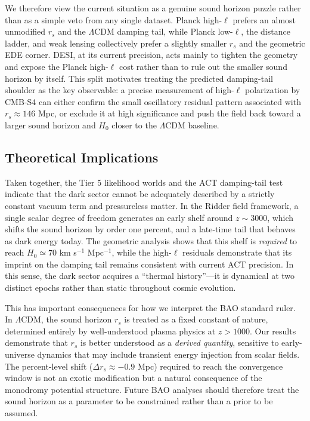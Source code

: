 \documentclass[a4paper,11pt]{article}
\begin{document}
We therefore view the current situation as a genuine sound horizon puzzle rather than as a simple veto from any single dataset. Planck high-$\ell$ prefers an almost unmodified $r_s$ and the $\Lambda$CDM damping tail, while Planck low-$\ell$, the distance ladder, and weak lensing collectively prefer a slightly smaller $r_s$ and the geometric EDE corner. DESI, at its current precision, acts mainly to tighten the geometry and expose the Planck high-$\ell$ cost rather than to rule out the smaller sound horizon by itself. This split motivates treating the predicted damping-tail shoulder as the key observable: a precise measurement of high-$\ell$ polarization by CMB-S4 can either confirm the small oscillatory residual pattern associated with $r_s \approx 146$ Mpc, or exclude it at high significance and push the field back toward a larger sound horizon and $H_0$ closer to the $\Lambda$CDM baseline.

\subsection*{Theoretical Implications}

Taken together, the Tier 5 likelihood worlds and the ACT damping-tail test indicate that the dark sector cannot be adequately described by a strictly constant vacuum term and pressureless matter. In the Ridder field framework, a single scalar degree of freedom generates an early shelf around $z \sim 3000$, which shifts the sound horizon by order one percent, and a late-time tail that behaves as dark energy today. The geometric analysis shows that this shelf is \emph{required} to reach $H_0 \simeq 70$ km s$^{-1}$ Mpc$^{-1}$, while the high-$\ell$ residuals demonstrate that its imprint on the damping tail remains consistent with current ACT precision. In this sense, the dark sector acquires a ``thermal history''---it is dynamical at two distinct epochs rather than static throughout cosmic evolution.

This has important consequences for how we interpret the BAO standard ruler. In $\Lambda$CDM, the sound horizon $r_s$ is treated as a fixed constant of nature, determined entirely by well-understood plasma physics at $z > 1000$. Our results demonstrate that $r_s$ is better understood as a \emph{derived quantity}, sensitive to early-universe dynamics that may include transient energy injection from scalar fields. The percent-level shift ($\Delta r_s \approx -0.9$ Mpc) required to reach the convergence window is not an exotic modification but a natural consequence of the monodromy potential structure. Future BAO analyses should therefore treat the sound horizon as a parameter to be constrained rather than a prior to be assumed.
\end{document}
